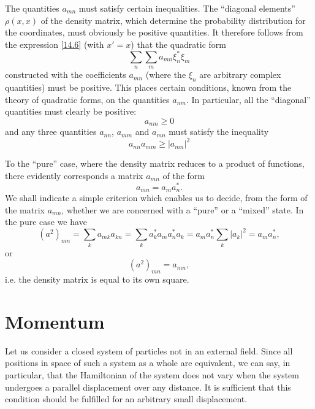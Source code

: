 The quantities $ a_{mn} $ must satisfy certain inequalities. The “diagonal elements” $ \rho(x, x) $ of the density matrix, which determine the probability distribution for the coordinates, must obviously be positive quantities. It therefore follows from the expression \eqref{14.6} (with $ x'= x $) that the quadratic form
\[ \sum_n\sum_ma_{mn}\xi_n^*\xi_m \]
constructed with the coefficients $ a_{mn} $ (where the $ \xi_n $ are arbitrary complex quantities) must be positive. This places certain conditions, known from the theory of quadratic forms, on the quantities $ a_{nm} $. In particular, all the “diagonal” quantities must clearly be positive:
\begin{equation}\label{14.9}
a_{nm}\geqslant0
\end{equation}
and any three quantities $ a_{nn} $, $ a_{mm} $ and $ a_{mn} $ must satisfy the inequality
\begin{equation}\label{14.10}
a_{nn}a_{mm}\geqslant|a_{mn}|^2
\end{equation}


To the “pure” case, where the density matrix reduces to a product of functions, there evidently corresponds a matrix $ a_{mn} $ of the form
\begin{equation}\label{14.11}
a_{mn}=a_ma_n^*.
\end{equation}
We shall indicate a simple criterion which enables us to decide, from the form of the matrix $ a_{mn} $, whether we are concerned with a “pure” or a “mixed” state. In the pure case we have
\[ (a^2)_{mn}=\sum_ka_{mk}a_{kn}=\sum_ka_k^*a_ma_n^*a_k=a_ma_n^*\sum_k|a_k|^2=a_ma_n^*, \]
or
\begin{equation}\label{14.12}
(a^2)_{mn}=a_{mn},
\end{equation}
i.e. the density matrix is equal to its own square.
\section{Momentum}
Let us consider a closed system of particles not in an external field. Since all positions in space of such a system as a whole are equivalent, we can say, in particular, that the Hamiltonian of the system does not vary when the system undergoes a parallel displacement over any distance. It is sufficient that this condition should be fulfilled for an arbitrary small displacement.

